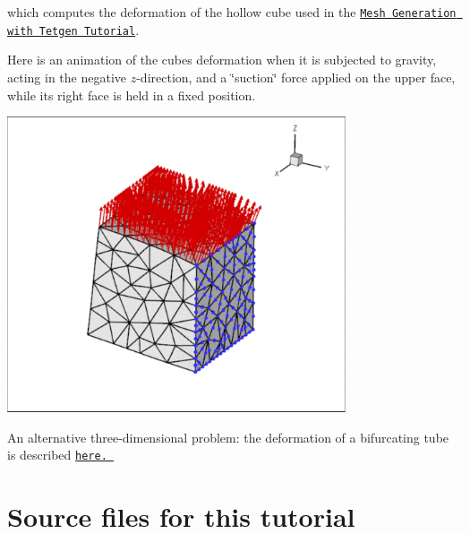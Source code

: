 which computes the deformation of the hollow cube used in the \href{../../../meshes/mesh_from_tetgen/html/index.html}{\tt Mesh Generation with Tetgen Tutorial}.

Here is an animation of the cube\textquotesingle{}s deformation when it is subjected to gravity, acting in the negative $ z $-\/direction, and a \char`\"{}suction\char`\"{} force applied on the upper face, while its right face is held in a fixed position.

 
\begin{DoxyImage}
\includegraphics[width=0.75\textwidth]{three_d}
\end{DoxyImage}


An alternative three-\/dimensional problem\+: the deformation of a bifurcating tube is described \href{../../unstructured_three_d_solid/html/index.html}{\tt here. }



 

\hypertarget{index_sources}{}\section{Source files for this tutorial}\label{index_sources}

